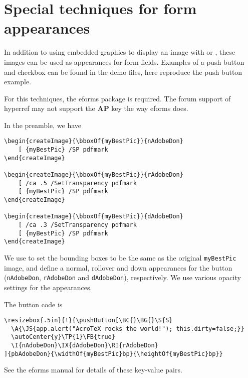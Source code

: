 \documentclass{article}
\let\pkg\textsf
\begin{document}
\section{Special techniques for form appearances}\label{forms}

In addition to using embedded graphics to display an image with
 or , these images can be
used as appearances for form fields. Examples of a push button and
checkbox can be found in the demo files, here reproduce the push
button example.

For this techniques, the eforms package is required. The forum
support of hyperref may not support the \textbf{AP} key the way
eforms does.

In the preamble, we have
\begin{Verbatim}
\begin{createImage}{\bboxOf{myBestPic}}{nAdobeDon}
    [ {myBestPic} /SP pdfmark
\end{createImage}

\begin{createImage}{\bboxOf{myBestPic}}{rAdobeDon}
    [ /ca .5 /SetTransparency pdfmark
    [ {myBestPic} /SP pdfmark
\end{createImage}

\begin{createImage}{\bboxOf{myBestPic}}{dAdobeDon}
    [ /ca .3 /SetTransparency pdfmark
    [ {myBestPic} /SP pdfmark
\end{createImage}
\end{Verbatim}

We use  to set the bounding boxes to be the same as the
original \texttt{myBestPic} image, and define a normal, rollover and
down appearances for the button (\texttt{nAdobeDon},
\texttt{rAdobeDon} and \texttt{dAdobeDon}), respectively. We use
various opacity settings for the appearances.

The button code is

\begin{Verbatim}[xleftmargin=\parindent,fontsize=\small]
\resizebox{.5in}{!}{\pushButton[\BC{}\BG{}\S{S}
  \A{\JS{app.alert("AcroTeX rocks the world!"); this.dirty=false;}}
  \autoCenter{y}\TP{1}\FB{true}
  \I{nAdobeDon}\IX{dAdobeDon}\RI{rAdobeDon}
]{pbAdobeDon}{\widthOf{myBestPic}bp}{\heightOf{myBestPic}bp}}
\end{Verbatim}
See the \pkg{eforms} manual for details of these key-value pairs.\smallskip
\end{document}
